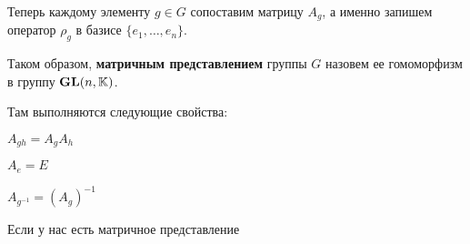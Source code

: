 Теперь  каждому элементу $g \in G$ сопоставим матрицу $A_g$, а именно запишем оператор $\rho_g$ в базисе $\lbrace e_1, \ldots , e_n \rbrace$.
 \begin{df}
 	Таком образом, {\bf матричным представлением} группы $G$ назовем ее гомоморфизм в группу $\mathbf{GL}(n, \mathbb{K})$.

 	Там выполняются следующие свойства:
 	\begin{points}{-3}
 		\item $A_{gh} = A_g A_h$
 		\item $A_e = E$
 		\item $A_{g^{-1}} = (A_g)^{-1}$
 	\end{points}
 \end{df}

Если у нас есть матричное представление 